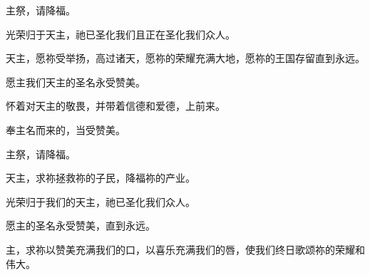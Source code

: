 \par

主祭，请降福。\par

\par

光荣归于天主，祂已圣化我们且正在圣化我们众人。\par

\par

天主，愿祢受举扬，高过诸天，愿祢的荣耀充满大地，愿祢的王国存留直到永远。\par

\par

愿主我们天主的圣名永受赞美。\par

\par

怀着对天主的敬畏，并带着信德和爱德，上前来。\par

\par

奉主名而来的，当受赞美。\par

\par

主祭，请降福。\par

\par

天主，求祢拯救祢的子民，降福祢的产业。\par

\par

光荣归于我们的天主，祂已圣化我们众人。\par

\par

愿主的圣名永受赞美，直到永远。\par

\par

主，求祢以赞美充满我们的口，以喜乐充满我们的唇，使我们终日歌颂祢的荣耀和伟大。\par

